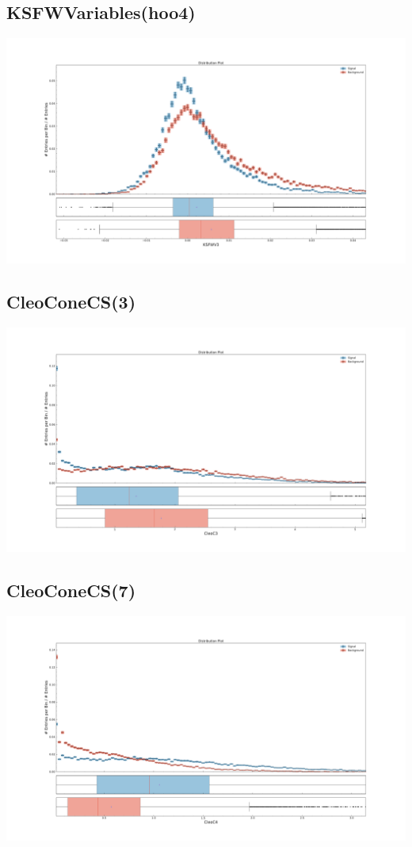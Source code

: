 \documentclass[10pt,a4paper]{article}
\begin{document}
\subsection{KSFWVariables(hoo4)}
\begin{center}
\includegraphics[width=1.0\textwidth]{variable_-9039547422608037842.pdf}
\end{center}
\subsection{CleoConeCS(3)}
\begin{center}
\includegraphics[width=1.0\textwidth]{variable_4505174704446674012.pdf}
\end{center}
\subsection{CleoConeCS(7)}
\begin{center}
\includegraphics[width=1.0\textwidth]{variable_-7867760830136271147.pdf}
\end{center}
\end{document}
